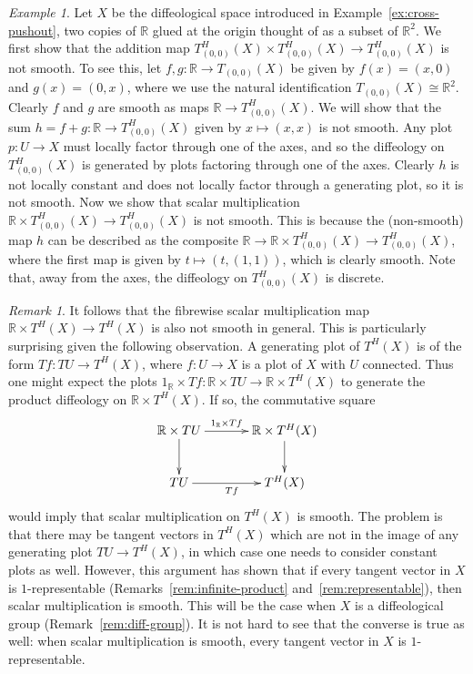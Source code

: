 \documentclass[12pt]{amsart}
\theoremstyle{remark}
\newtheorem{rem}[de]{Remark}
\newtheorem{ex}[de]{Example}
\newcommand{\ra}{\to}
\def \R{\mathbb{R}}
\begin{document}
\begin{ex}\label{ex:bundleofcross}
Let $X$ be the diffeological space introduced in Example~\ref{ex:cross-pushout},
two copies of $\R$ glued at the origin thought of as a subset of $\R^2$.
We first show that the addition map
$T_{(0,0)}^H(X) \times T_{(0,0)}^H(X) \ra T_{(0,0)}^H(X)$ is not smooth.
To see this, let $f, g: \R \ra T_{(0,0)}(X)$ be given by
$f(x)=(x,0)$ and $g(x)=(0,x)$,
where we use the natural identification $T_{(0,0)}(X) \cong \R^2$.
Clearly $f$ and $g$ are smooth as maps $\R \ra T_{(0,0)}^H(X)$.
We will show that the sum $h = f + g: \R \ra T_{(0,0)}^H(X)$
given by $x \mapsto (x,x)$ is not smooth.
Any plot $p: U \to X$ must locally factor through one of the axes,
and so the diffeology on $T_{(0,0)}^H(X)$ is generated by plots
factoring through one of the axes.
Clearly $h$ is not locally constant and
does not locally factor through a generating plot,
so it is not smooth.
Now we show that scalar multiplication
$\R \times T_{(0,0)}^H(X) \ra T_{(0,0)}^H(X)$ is not smooth.
This is because the (non-smooth) map $h$ can be described as the composite
$\R \ra \R \times T_{(0,0)}^H(X) \ra T_{(0,0)}^H(X)$,
where the first map is given by $t \mapsto (t,(1,1))$, which is clearly smooth.
Note that, away from the axes, the diffeology on $T_{(0,0)}^H(X)$ is discrete.
\end{ex}

\begin{rem}\label{rem:scalar-mult}
It follows that the fibrewise scalar multiplication map $\R \times T^H(X) \to T^H(X)$
is also not smooth in general.
This is particularly surprising given the following observation.
A generating plot of $T^H(X)$ is of the form $Tf : TU \to T^H(X)$,
where $f : U \to X$ is a plot of $X$ with $U$ connected.
Thus one might expect the plots $1_{\R} \times Tf : \R \times TU \to \R \times T^H(X)$
to generate the product diffeology on $\R \times T^H(X)$.
If so, the commutative square
\[
\xymatrix@C+10pt{\R \times TU \ar[r]^-{1_{\R} \times Tf} \ar[d] & \R \times T^H(X) \ar[d] \\
                    TU \ar[r]_{Tf}                   & T^H(X) }
\]
would imply that scalar multiplication on $T^H(X)$ is smooth.
The problem is that there may be tangent vectors in $T^H(X)$ which are
not in the image of any generating plot $TU \to T^H(X)$, in which case
one needs to consider constant plots as well.
However, this argument has shown that if every tangent vector in $X$ is
$1$-representable (Remarks~\ref{rem:infinite-product} and~\ref{rem:representable}),
then scalar multiplication is smooth.
This will be the case when $X$ is a diffeological group (Remark~\ref{rem:diff-group}).
It is not hard to see that the converse is true as well:  when scalar multiplication
is smooth, every tangent vector in $X$ is $1$-representable.
%
%
\end{rem}
\end{document}
